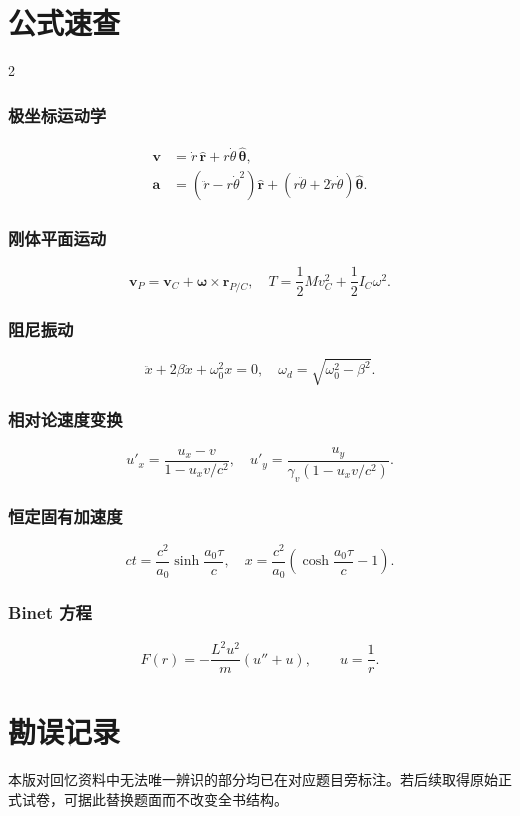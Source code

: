 \documentclass[UTF8,11pt,a4paper,openany]{ctexbook}
\numberwithin{equation}{chapter}
\newcommand{\vect}[1]{\bm{#1}}
\newcommand{\unitv}[1]{\hat{\bm{#1}}}
\begin{document}
\chapter*{公式速查}
\begin{multicols}{2}
\subsection*{极坐标运动学}
\[\begin{aligned}\vect v&=\dot r\,\unitv r+r\dot\theta\,\unitv\theta,\\
\vect a&=(\ddot r-r\dot\theta^2)\unitv r+(r\ddot\theta+2\dot r\dot\theta)\unitv\theta.\end{aligned}\]
\subsection*{刚体平面运动}
\[\vect v_P=\vect v_C+\vect\omega\times\vect r_{P/C},\quad T=\frac12Mv_C^2+\frac12I_C\omega^2.\]
\subsection*{阻尼振动}
\[\ddot x+2\beta\dot x+\omega_0^2x=0,\quad \omega_d=\sqrt{\omega_0^2-\beta^2}.\]
\subsection*{相对论速度变换}
\[u'_x=\frac{u_x-v}{1-u_xv/c^2},\quad u'_y=\frac{u_y}{\gamma_v(1-u_xv/c^2)}.\]
\subsection*{恒定固有加速度}
\[ct=\frac{c^2}{a_0}\sinh\frac{a_0\tau}{c},\quad x=\frac{c^2}{a_0}\left(\cosh\frac{a_0\tau}{c}-1\right).\]
\subsection*{Binet 方程}
\[F(r)=-\frac{L^2u^2}{m}(u''+u),\qquad u=\frac1r.\]
\end{multicols}
\chapter*{勘误记录}
本版对回忆资料中无法唯一辨识的部分均已在对应题目旁标注。若后续取得原始正式试卷，可据此替换题面而不改变全书结构。
\end{document}
